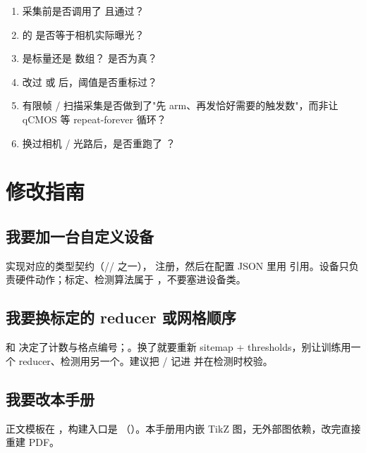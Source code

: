 \documentclass[11pt,oneside,openany]{book}
\begin{document}
\begin{enumerate}
\item 采集前是否调用了  且通过？
\item {} 的  是否等于相机实际曝光？
\item {} 是标量还是  数组？ 是否为真？
\item 改过  或  后，阈值是否重标过？
\item 有限帧 / 扫描采集是否做到了"先 arm、再发恰好需要的触发数"，而非让 qCMOS 等 repeat-forever 循环？
\item 换过相机 / 光路后，是否重跑了 ？
\end{enumerate}

\chapter{修改指南}

\section{我要加一台自定义设备}
实现对应的类型契约（// 之一）， 注册，然后在配置 JSON 里用  引用。设备只负责硬件动作；标定、检测算法属于 ，不要塞进设备类。

\section{我要换标定的 reducer 或网格顺序}
 和  决定了计数与格点编号；。换了就要重新 sitemap + thresholds，别让训练用一个 reducer、检测用另一个。建议把 / 记进  并在检测时校验。

\section{我要改本手册}
正文模板在 ，构建入口是 （）。本手册用内嵌 TikZ 图，无外部图依赖，改完直接重建 PDF。
\end{document}
